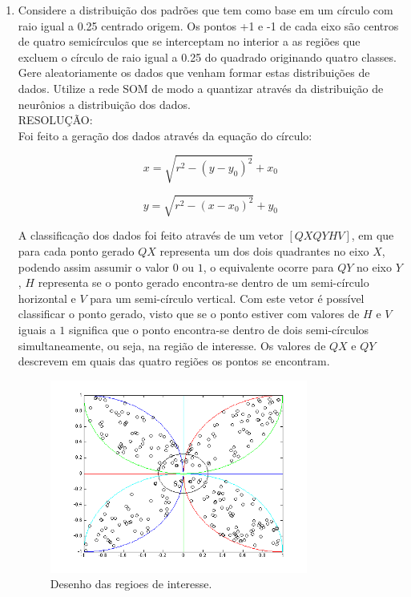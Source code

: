 \documentclass[a4paper,oneside,12pt]{article}
\begin{document}
\begin{enumerate}[1.]




\item Considere a distribui\c{c}\~ao dos padr\~oes que tem como base em um c\'irculo com raio igual a 0.25 centrado origem. Os pontos +1 e -1 de cada eixo s\~ao centros de quatro semic\'irculos que se interceptam no interior a as regi\~oes que excluem o c\'irculo de raio igual a 0.25 do quadrado originando quatro classes. Gere aleatoriamente os dados que venham formar estas distribui\c{c}\~oes de dados. Utilize a rede SOM de modo a quantizar atrav\'es da distribui\c{c}\~ao de neur\^onios a distribui\c{c}\~ao dos dados. \\

RESOLU\c{C}\~AO: \\

Foi feito a gera\c{c}\~ao dos dados atrav\'es da equa\c{c}\~ao do c\'irculo:

\begin{equation*}
x = \sqrt{r^{2} - (y - y_{0})^{2}} + x_{0}
\end{equation*}

\begin{equation*}
y = \sqrt{r^{2} - (x - x_{0})^{2}} + y_{0}
\end{equation*}

A classifica\c{c}\~ao dos dados foi feito atrav\'es de um vetor $[QX QY H V]$, em que para cada ponto gerado $QX$ representa um dos dois quadrantes no eixo $X$, podendo assim assumir o valor $0$ ou $1$, o equivalente ocorre para $QY$ no eixo $Y$, $H$ representa se o ponto gerado encontra-se dentro de um semi-c\'irculo horizontal e $V$ para um semi-c\'irculo vertical. Com este vetor \'e poss\'ivel classificar o ponto gerado, visto que se o ponto estiver com valores de $H$ e $V$ iguais a $1$ significa que o ponto encontra-se dentro de dois semi-c\'irculos simultaneamente, ou seja, na regi\~ao de interesse. Os valores de $QX$ e $QY$ descrevem em quais das quatro regi\~oes os pontos se encontram.

\begin{figure}
\centering
\includegraphics[width=0.8\textwidth]{q8_1.png}
\caption{Desenho das regioes de interesse.}
\label{fig:q8_1}
\end{figure}


\end{enumerate}
\end{document}
